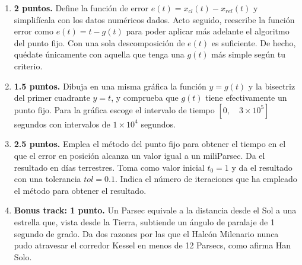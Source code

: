 \begin{enumerate}
\begin{enumerate}
	\item {\bf 2 puntos.} Define la función de error $e(t) = x_{cl}(t) - x_{rel}(t)$ y simplifícala con los datos numéricos dados. Acto seguido, reescribe la función error como $e(t) = t - g(t)$ para poder aplicar más adelante el algoritmo del punto fijo. Con una sola descomposición de $e(t)$ es suficiente. De hecho, quédate únicamente con aquella que tenga una $g(t)$ más simple según tu criterio.

	\item {\bf 1.5 puntos.} Dibuja en una misma gráfica la función $y = g(t)$ y la bisectriz del primer cuadrante $y = t$, y comprueba que $g(t)$ tiene efectivamente un punto fijo. Para la gráfica escoge el intervalo de tiempo $[0, \quad 3 \times 10^5]$ segundos con intervalos de $1\times 10^4$ segundos.
	\item {\bf 2.5 puntos.} Emplea el método del punto fijo para obtener el tiempo en el que el error en posición alcanza un valor igual a un miliParsec. Da el resultado en días terrestres. Toma como valor inicial $t_0 = 1$ y da el resultado con una tolerancia $tol = 0.1$. Indica el número de iteraciones que ha empleado el método para obtener el resultado.
	\item {\bf Bonus track: 1 punto.} Un Parsec equivale a la distancia desde el Sol a una estrella que, vista desde la Tierra, subtiende un ángulo de paralaje de 1 segundo de grado. Da dos razones por las que el Halcón Milenario nunca pudo atravesar el corredor Kessel en menos de 12 Parsecs, como afirma Han Solo.

\end{enumerate}
\end{enumerate}
